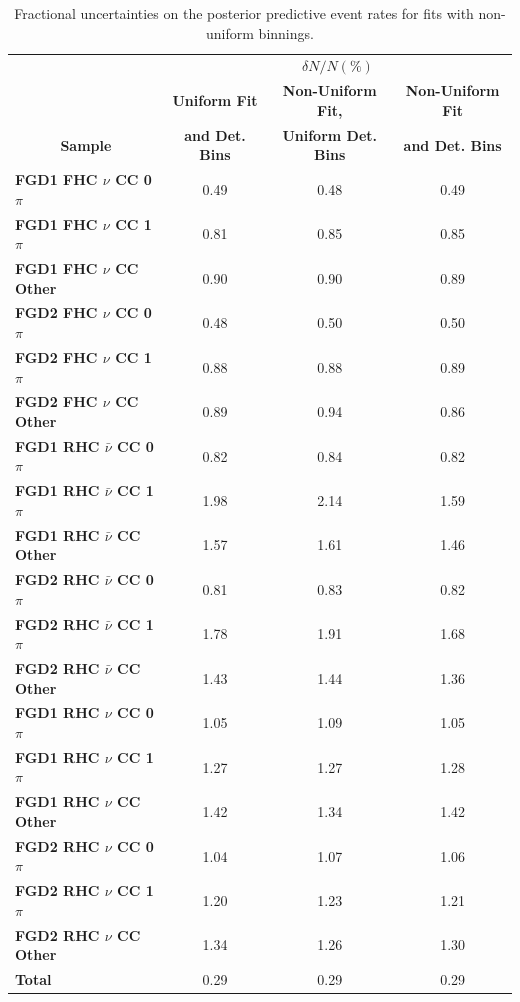 \begin{center}
\begin{table}[!htbp]
\center
\begin{tabular}{l||c c c}
\hline \hline
& \multicolumn{3}{c}{$\delta N/N(\%)$}\\
& \multicolumn{1}{c}{\textbf{Uniform Fit}} & \multicolumn{1}{c}{\textbf{Non-Uniform Fit,}} & \multicolumn{1}{c}{\textbf{Non-Uniform Fit}}\\
\multicolumn{1}{c||}{\textbf{Sample}} & \multicolumn{1}{c}{\textbf{and Det. Bins}} & \multicolumn{1}{c}{\textbf{Uniform Det. Bins}} & \multicolumn{1}{c}{\textbf{and Det. Bins}}\\
\hline
\hline
\textbf{FGD1 FHC $\nu$ CC 0$\pi$} & 0.49 & 0.48 & 0.49\\
\textbf{FGD1 FHC $\nu$ CC 1$\pi$} & 0.81 & 0.85 & 0.85\\ 
\textbf{FGD1 FHC $\nu$ CC Other} & 0.90 & 0.90 & 0.89\\ \hline
\textbf{FGD2 FHC $\nu$ CC 0$\pi$} & 0.48 & 0.50 & 0.50\\
\textbf{FGD2 FHC $\nu$ CC 1$\pi$} & 0.88 & 0.88 & 0.89\\
\textbf{FGD2 FHC $\nu$ CC Other} & 0.89 & 0.94 & 0.86\\ \hline
\textbf{FGD1 RHC $\bar{\nu}$ CC 0$\pi$} & 0.82 & 0.84 & 0.82\\
\textbf{FGD1 RHC $\bar{\nu}$ CC 1$\pi$} & 1.98 & 2.14 & 1.59\\
\textbf{FGD1 RHC $\bar{\nu}$ CC Other} & 1.57 & 1.61 & 1.46\\ \hline
\textbf{FGD2 RHC $\bar{\nu}$ CC 0$\pi$} & 0.81 & 0.83 & 0.82\\
\textbf{FGD2 RHC $\bar{\nu}$ CC 1$\pi$} & 1.78 & 1.91 & 1.68\\
\textbf{FGD2 RHC $\bar{\nu}$ CC Other} & 1.43 & 1.44 & 1.36\\ \hline
\textbf{FGD1 RHC $\nu$ CC 0$\pi$} & 1.05 & 1.09 & 1.05\\
\textbf{FGD1 RHC $\nu$ CC 1$\pi$} & 1.27 & 1.27 & 1.28\\
\textbf{FGD1 RHC $\nu$ CC Other}& 1.42  & 1.34 & 1.42\\ \hline
\textbf{FGD2 RHC $\nu$ CC 0$\pi$} & 1.04 & 1.07 & 1.06\\
\textbf{FGD2 RHC $\nu$ CC 1$\pi$} & 1.20 & 1.23 & 1.21\\ 
\textbf{FGD2 RHC $\nu$ CC Other} & 1.34 & 1.26 & 1.30\\ \hline
\textbf{Total} & 0.29 & 0.29 & 0.29 \\ \hline\hline
\end{tabular}
\caption{Fractional uncertainties on the posterior predictive event rates for fits with non-uniform binnings.}
\label{tab:polyprederr}
\end{table}
\end{center}

